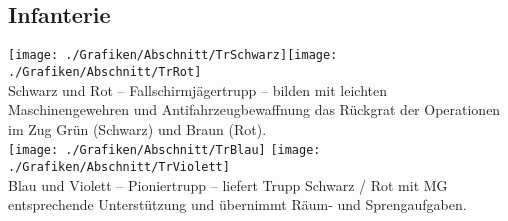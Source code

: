 \subsection{Infanterie}
\texttt{[image: ./Grafiken/Abschnitt/TrSchwarz]}\quad\texttt{[image: ./Grafiken/Abschnitt/TrRot]}\\
Schwarz und Rot -- Fallschirmjägertrupp -- bilden mit leichten Maschinengewehren und Antifahrzeugbewaffnung das Rückgrat der Operationen im Zug Grün (Schwarz) und Braun (Rot).\\

\texttt{[image: ./Grafiken/Abschnitt/TrBlau]} \quad \texttt{[image: ./Grafiken/Abschnitt/TrViolett]}\\
Blau und Violett -- Pioniertrupp -- liefert Trupp Schwarz / Rot mit MG entsprechende Unterstützung und übernimmt Räum- und Sprengaufgaben.